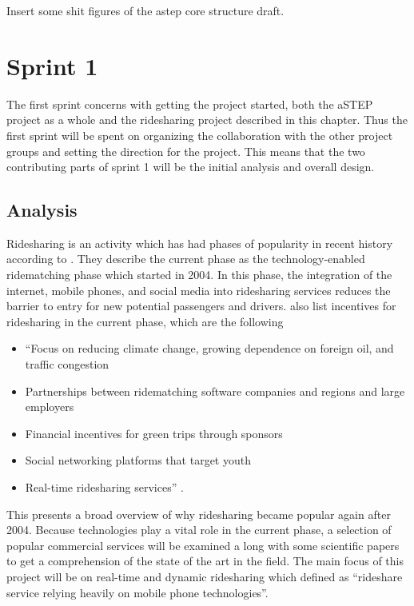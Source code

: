 Insert some shit figures of the \gls{astep} core structure draft.

\chapter{Sprint 1}
The first sprint concerns with getting the project started, both the aSTEP project as a whole and the ridesharing project described in this chapter.
Thus the first sprint will be spent on organizing the collaboration with the other project groups and setting the direction for the project.
This means that the two contributing parts of sprint 1 will be the initial analysis and overall design.
\section{Analysis}
Ridesharing is an activity which has had phases of popularity in recent history according to \citet{doi:10.1080/01441647.2011.621557}.
They describe the current phase as the technology-enabled ridematching phase which started in 2004.
In this phase, the integration of the internet, mobile phones, and social media into ridesharing services reduces the barrier to entry for new potential passengers and drivers.
\citet{doi:10.1080/01441647.2011.621557} also list incentives for ridesharing in the current phase, which are the following 

\begin{itemize}
  \item ``Focus on reducing climate change, growing dependence on foreign oil, and traffic congestion
  \item Partnerships between ridematching software companies and regions and large employers
  \item Financial incentives for green trips through sponsors
  \item Social networking platforms that target youth
  \item Real-time ridesharing services'' \citep{doi:10.1080/01441647.2011.621557}.
\end{itemize}

This presents a broad overview of why ridesharing became popular again after 2004.
Because technologies play a vital role in the current phase, a selection of popular commercial services will be examined a long with some scientific papers to get a comprehension of the state of the art in the field.
The main focus of this project will be on real-time and dynamic ridesharing which \citet{amey2011real} defined as ``rideshare service relying heavily on mobile phone technologies''.

